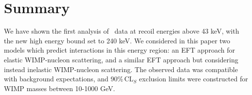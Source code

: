 \section{Summary}
We have shown the first analysis of \Xehund\ data at recoil energies above 43 keV, with the new high energy bound set to 240 keV. We considered in this paper two models which predict interactions in this energy region: an EFT approach for elastic WIMP-nucleon scattering, and a similar EFT approach but considering instead inelastic WIMP-nucleon scattering. The observed data was compatible with background expectations, and 90\%\,CL$_S$ exclusion limits were constructed for WIMP masses between 10-1000 GeV. 
